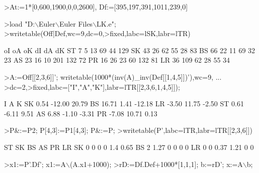 \documentclass[a4paper,10pt]{article}
\begin{document}
\begin{eulernotebook}
\begin{eulerprompt}
>At:=1*[0,600,1900,0,0,2600], Df:=[395,197,391,1011,239,0]
\end{eulerprompt}
\begin{euleroutput}
  [0, 600, 1900, 0, 0, 2600]
  [395, 197, 391, 1011, 239, 0]
\end{euleroutput}
\begin{eulerprompt}
>load "D:\(\backslash\)Euler\(\backslash\)Euler Files\(\backslash\)LK.e";
>writetable(Off|Def,wc=9,dc=0,>fixed,labc=lSK,labr=lTR)
\end{eulerprompt}
\begin{euleroutput}
                  oI       oA       oK       dI       dA       dK
         ST        7        5       13       69       44      129
         SK       43       26       62       55       28       83
         BS       66       22       11       69       32       23
         AS       23       16       10      201      132       72
         PR       16       26       23       60      132       81
         LR       36      109       62       28       55       34
\end{euleroutput}
\begin{eulerprompt}
>A:=Off[[2,3,6]]'; writetable(1000*(inv(A)_inv(Def[[1,4,5]])'),wc=9, ...
>dc=2,>fixed,labc=["I","A","K"],labr=lTR[[2,3,6,1,4,5]]);
\end{eulerprompt}
\begin{euleroutput}
                   I        A        K
         SK     0.54   -12.00    20.79
         BS    16.71     1.41   -12.18
         LR    -3.50    11.75    -2.50
         ST     0.61    -6.11     9.51
         AS     6.88    -1.10    -3.31
         PR    -7.08    10.71     0.13
\end{euleroutput}
\begin{eulerprompt}
>P&:=P2; P[4,3]:=P1[4,3]; P&:=P;
>writetable(P',labc=lTR,labr=lTR[[2,3,6]])
\end{eulerprompt}
\begin{euleroutput}
                    ST        SK        BS        AS        PR        LR
          SK         0         0         0         0       1.4      0.65
          BS         2      1.27         0         0         0         0
          LR         0         0      0.37      1.21         0         0
\end{euleroutput}
\begin{eulerprompt}
>x1:=P'.Df'; x1:=A\(\backslash\)(A.x1+1000);
>rD:=Df.Def+1000*[1,1,1]; b:=rD'; x:=A\(\backslash\)b;

\end{eulerprompt}
\end{eulernotebook}
\end{document}

